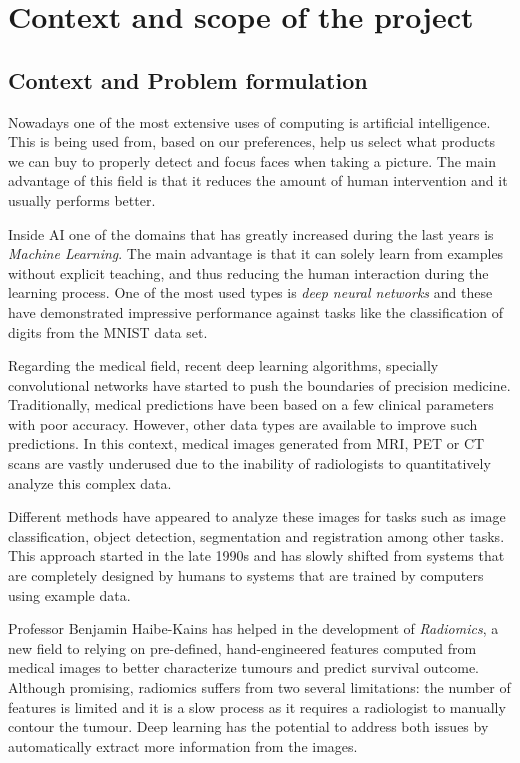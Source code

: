 
\section{Context and scope of the project}
\subsection{Context and Problem formulation}

Nowadays one of the most extensive uses of computing is artificial intelligence. This is being
used from, based on our preferences, help us select what products we can buy to properly detect
and focus faces when taking a picture. The main advantage of this field is that it reduces the
amount of human intervention and it usually performs better.

Inside AI one of the domains that has greatly increased during the last years is 
\emph{Machine Learning}. The main advantage is that it can solely learn from examples without 
explicit teaching, and thus reducing the human interaction during the learning process. One of the 
most used types is \emph{deep neural networks} and these have demonstrated impressive performance 
against tasks like the classification of digits from the MNIST data set.
~\cites{MNIST}{empirical-evaluation-deep-architectures}

Regarding the medical field, recent deep learning algorithms, specially convolutional networks 
have started to push the boundaries of precision medicine. 
Traditionally, medical predictions have been based on a few clinical parameters with poor accuracy.
However, other data types are available to improve such predictions. In this context, medical
images generated from MRI, PET or CT scans are vastly underused due to the inability of radiologists
to quantitatively analyze this complex data.

Different methods have appeared to analyze these images for tasks such as
image classification, object detection, segmentation and registration among other tasks. This
approach started in the late 1990s and has slowly shifted from systems that are completely designed
by humans to systems that are trained by computers using example data. 
~\cite{survey-deep-learning}

Professor Benjamin Haibe-Kains has helped in the development of \emph{Radiomics}, a new field to
relying on pre-defined, hand-engineered features computed from medical images to better 
characterize tumours and predict survival outcome. Although promising, radiomics suffers from 
two several limitations: the number of features is limited and it is a slow process as it requires
a radiologist to manually contour the tumour. Deep learning has the potential to address both issues
by automatically extract more information from the images.
~\cite{radiomics-ML-classifiers}

